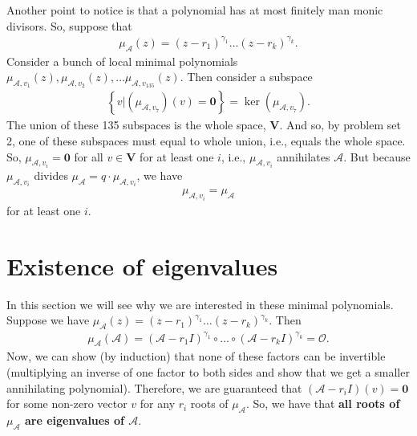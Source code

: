 \documentclass{book}
\theoremstyle{definition}
\newcommand{\V}{\mathbf{V}}
\newcommand{\A}{\mathcal{A}}
\begin{document}
Another point to notice is that a polynomial has at most finitely man monic divisors. So, suppose that
\begin{align*}
\mu_\A(z) = (z- r_1)^{\gamma_1}\dots (z - r_k)^{\gamma_k}.
\end{align*}
Consider a bunch of local minimal polynomials $\mu_{\A,v_1}(z), \mu_{\A,v_2}(z), \dots \mu_{\A,v_135}(z) $. Then consider a subspace
\begin{align*}
\left\{
v \bigg\vert (\mu_{\A,v_7})(v) = \mathbf{0}
\right\} = \ker\left( \mu_{\A,v_7} \right).
\end{align*}
The union of these 135 subspaces is the whole space, $\V$. And so, by problem set 2, one of these subspaces must equal to whole union, i.e., equals the whole space. So, $\mu_{\A,v_i} = \mathbf{0}$ for all $v\in \V$ for at least one $i$, i.e., $\mu_{\A, v_i}$ annihilates $\A$. But because $\mu_{\A,v_i}$ divides $\mu_{\A} = q\cdot \mu_{\A,v_i}$, we have
\begin{align*}
\mu_{\A,v_i} = \mu_{\A}
\end{align*} 
for at least one $i$. 





\section{Existence of eigenvalues}

In this section we will see why we are interested in these minimal polynomials. Suppose we have $\mu_\A(z) = (z- r_1)^{\gamma_1}\dots (z - r_k)^{\gamma_k}$. Then
\begin{align*}
\mu_\A(\A) = (\A- r_1 I)^{\gamma_1}\circ \dots \circ (\A - r_k I)^{\gamma_k} = \mathcal{O}.
\end{align*}
Now, we can show (by induction) that none of these factors can be invertible (multiplying an inverse of one factor to both sides and show that we get a smaller annihilating polynomial). Therefore, we are guaranteed that $(\A - r_i I)(v) = \mathbf{0}$ for some non-zero vector $v$ for any $r_i$ roots of $\mu_{\A}$. So, we have that \textbf{all roots of $\mu_\A$ are eigenvalues of $\A$}. \\
\end{document}
